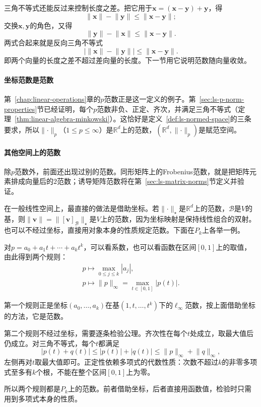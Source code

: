三角不等式还能反过来控制长度之差。把它用于$\bm x=(\bm x-\bm y)+\bm y$，得
\[
 \lVert\bm x\rVert-\lVert\bm y\rVert\leq\lVert\bm x-\bm y\rVert;
\]
交换$\bm x,\bm y$的角色，又得
\[
 \lVert\bm y\rVert-\lVert\bm x\rVert\leq\lVert\bm x-\bm y\rVert.
\]
两式合起来就是反向三角不等式
\begin{equation}
 \bigl|\lVert\bm x\rVert-\lVert\bm y\rVert\bigr|\leq\lVert\bm x-\bm y\rVert.
 \label{eq:ls-reverse-triangle}
\end{equation}
即两个向量的长度之差不超过差向量的长度。下一节用它说明范数随向量收敛。

\paragraph{坐标范数是范数}
\label{sec:ls-norms-distances}
\label{sec:linear-algebra-distance-relations}
第~\ref{chap:linear-operations}章的$p$范数正是这一定义的例子。第~\ref{sec:ls-p-norm-properties}节已经证明，每个$p$范数非负、正定、齐次，并满足三角不等式（定理~\ref{thm:linear-algebra-minkowski}）。这恰好是定义~\ref{def:ls-normed-space}的三条要求，所以$\lVert\cdot\rVert_p$（$1\leq p\leq\infty$）是$\mathbb R^d$上的范数，$(\mathbb R^d,\lVert\cdot\rVert_p)$是赋范空间。

\paragraph{其他空间上的范数}
除$p$范数外，前面还出现过别的范数。同形矩阵上的Frobenius范数，就是把矩阵元素排成向量后的$2$范数；诱导矩阵范数将在第~\ref{sec:ls-matrix-norms}节定义并验证。

在一般线性空间上，最直接的做法是借助坐标。若$\lVert\cdot\rVert_\star$是$\mathbb R^d$上的范数，$\mathcal B$是$V$的基，则$\lVert\bm v\rVert=\lVert[\bm v]_{\mathcal B}\rVert_\star$是$V$上的范数，因为坐标映射是保持线性组合的双射。也可以不经过坐标，直接用对象本身的性质规定范数。下面在$P_k$上各举一例。
\begin{example}[多项式空间上的两个范数]
\label{ex:ls-polynomial-norms}
对$p=a_0+a_1t+\cdots+a_kt^k$，可以看系数，也可以看函数在区间$[0,1]$上的取值，由此得到两个规则：
\[
\begin{gathered}
p\mapsto\max_{0\leq j\leq k}|a_j|,\\
p\mapsto\lVert p\rVert_\infty=\max_{t\in[0,1]}|p(t)| .
\end{gathered}
\]

第一个规则正是坐标$(a_0,\ldots,a_k)$在基$(1,t,\ldots,t^k)$下的$\ell_\infty$范数，按上面借助坐标的方法，它是范数。

第二个规则不经过坐标，需要逐条检验公理。齐次性在每个$t$处成立，取最大值后仍成立。对三角不等式，每个$t$都满足
\[
 |p(t)+q(t)|\leq|p(t)|+|q(t)|\leq\lVert p\rVert_\infty+\lVert q\rVert_\infty,
\]
左侧再对$t$取最大值即可。正定性依赖多项式的代数性质：次数不超过$k$的非零多项式至多有$k$个根，不能在整个区间$[0,1]$上为零。

所以两个规则都是$P_k$上的范数。前者借助坐标，后者直接用函数值，检验时只需用到多项式本身的性质。
\end{example}

